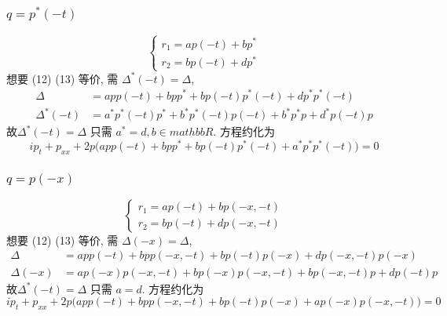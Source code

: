 \subsubsection{ $ q = p^{*}(-t) $}
\begin{equation*}
    \begin{cases}
        r_1 = ap(-t) + bp^{*} \\
        r_2 = bp(-t) + dp^{*} 
    \end{cases}
\end{equation*}
想要 (12) (13) 等价, 需 $ \Delta^{*}(-t) = \Delta $,
\begin{equation*}
    \begin{aligned}
        \Delta &= app(-t) + bpp^{*} + bp(-t)p^{*}(-t) + dp^{*}p^{*}(-t) \\
        \Delta^{*}(-t) &= a^{*}p^{*}(-t)p^{*} + b^{*}p^{*}(-t)p(-t) + b^{*}p^{*}p + d^{*}p(-t)p   
    \end{aligned}
\end{equation*}
故$ \Delta^{*}(-t) = \Delta $ 只需 $ a^{*} = d, b \in mathbb{R} $. 方程约化为
\begin{equation*}
    ip_t + p_{xx} + 2p \big( app(-t) + bpp^{*} + bp(-t)p^{*}(-t) + a^{*}p^{*}p^{*}(-t) \big) = 0
\end{equation*}

\subsubsection{ $ q = p(-x) $}
\begin{equation*}
    \begin{cases}
        r_1 = ap(-t) + bp(-x,-t) \\
        r_2 = bp(-t) + dp(-x,-t)
    \end{cases}
\end{equation*}
想要 (12) (13) 等价, 需 $ \Delta(-x) = \Delta $,
\begin{equation*}
    \begin{aligned}
        \Delta &= app(-t) + bpp(-x,-t) + bp(-t)p(-x) + dp(-x,-t)p(-x) \\
        \Delta(-x) &= ap(-x)p(-x,-t) + bp(-x)p(-x,-t) + bp(-x,-t)p + dp(-t)p   
    \end{aligned}
\end{equation*}
故$ \Delta^{*}(-t) = \Delta $ 只需 $ a = d $. 方程约化为
\begin{equation*}
    ip_t + p_{xx} + 2p \big( app(-t) + bpp(-x,-t) + bp(-t)p(-x) + ap(-x)p(-x,-t) \big) = 0
\end{equation*}

